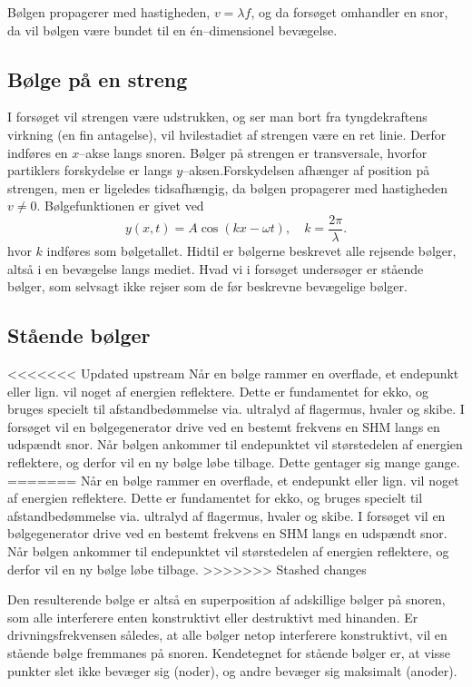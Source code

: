 \documentclass[A2_main.tex]{subfiles}
\begin{document}
Bølgen propagerer med hastigheden, $v = \lambda f$, og da forsøget omhandler en snor, da vil bølgen være bundet til en én--dimensionel bevægelse.

\subsection{Bølge på en streng}
I forsøget vil strengen være udstrukken, og ser man bort fra tyngdekraftens virkning (en fin antagelse), vil hvilestadiet af strengen være en ret linie. Derfor indføres en $x$--akse langs snoren. Bølger på strengen er transversale, hvorfor partiklers forskydelse er langs $y$--aksen.Forskydelsen afhænger af position på strengen, men er ligeledes tidsafhængig, da bølgen propagerer med hastigheden $v\neq 0$. Bølgefunktionen er givet ved
\begin{equation}
    y(x, t) = A\cos(kx -\omega t), \quad k = \frac{2\pi}{\lambda}.
    \label{eq: wave}
\end{equation}
hvor $k$ indføres som bølgetallet. Hidtil er bølgerne beskrevet alle rejsende bølger, altså i en bevægelse langs mediet. Hvad vi i forsøget undersøger er stående bølger, som selvsagt ikke rejser som de før beskrevne bevægelige bølger.

\subsection{Stående bølger}
<<<<<<< Updated upstream
Når en bølge rammer en overflade, et endepunkt eller lign. vil noget af energien reflektere. Dette er fundamentet for ekko, og bruges specielt til afstandbedømmelse via. ultralyd af flagermus, hvaler og skibe. I forsøget vil en bølgegenerator drive ved en bestemt frekvens en SHM langs en udspændt snor. Når bølgen ankommer til endepunktet vil størstedelen af energien reflektere, og derfor vil en ny bølge løbe tilbage. Dette gentager sig mange gange. 
=======
Når en bølge rammer en overflade, et endepunkt eller lign. vil noget af energien reflektere. Dette er fundamentet for ekko, og bruges specielt til afstandbedømmelse via. ultralyd af flagermus, hvaler og skibe. I forsøget vil en bølgegenerator drive ved en bestemt frekvens en SHM langs en udspændt snor. Når bølgen ankommer til endepunktet vil størstedelen af energien reflektere, og derfor vil en ny bølge løbe tilbage.
>>>>>>> Stashed changes

Den resulterende bølge er altså en superposition af adskillige bølger på snoren, som alle interferere enten konstruktivt eller destruktivt med hinanden. Er drivningsfrekvensen således, at alle bølger netop interferere konstruktivt, vil en stående bølge fremmanes på snoren. Kendetegnet for stående bølger er, at visse punkter slet ikke bevæger sig (noder), og andre bevæger sig maksimalt (anoder).
\end{document}
